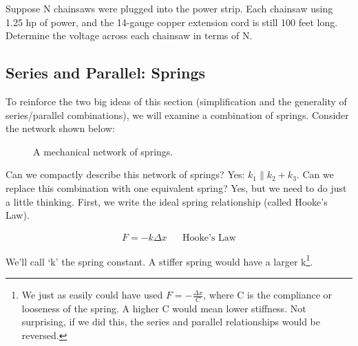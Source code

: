 \begin{clevel}
Suppose N chainsaws were plugged into the power strip. Each chainsaw using 1.25 hp of power, and the 14-gauge copper extension cord is still 100 feet long. Determine the voltage across each chainsaw in terms of N.
\end{clevel}

\subsection{Series and Parallel: Springs}
To reinforce the two big ideas of this section (simplification and the generality of series/parallel combinations), we will examine a combination of springs. Consider the network shown below:
\begin{figure}[H]
\begin{center}
\caption{A mechanical network of springs.}
\end{center}
\end{figure}

Can we compactly describe this network of springs? Yes: $k_1 \parallel k_2+k_3$. Can we replace this combination with one equivalent spring? Yes, but we need to do just a little thinking. First, we write the ideal spring relationship (called Hooke's Law).

\begin{align*}
F=-k\Delta x&&\text{Hooke's Law}
\end{align*}

We'll call `k' the spring constant. A stiffer spring would have a larger k\footnote{We just as easily could have used $F=-\frac{\Delta x}{C}$, where C is the compliance or looseness of the spring. A higher C would mean lower stiffness. Not surprising, if we did this, the series and parallel relationships would be reversed.}.

